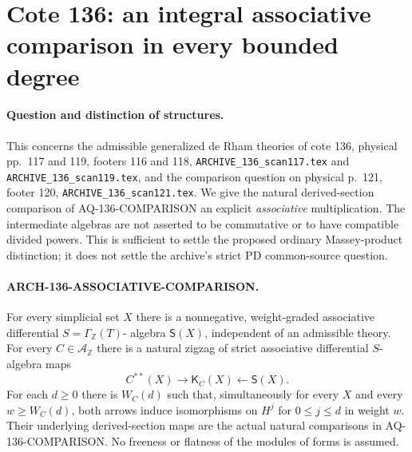 \section{Cote 136: an integral associative comparison in every bounded degree}
\label{sec:136associativecomparison}

\paragraph{Question and distinction of structures.}
This concerns the admissible generalized de Rham theories of
cote 136, physical pp.~117 and 119, footers 116 and 118,
\texttt{ARCHIVE\_136\_scan117.tex} and
\texttt{ARCHIVE\_136\_scan119.tex}, and the comparison question
on physical p.~121, footer 120, \texttt{ARCHIVE\_136\_scan121.tex}.
We give the natural derived-section comparison of
AQ-136-COMPARISON an explicit \emph{associative} multiplication.
The intermediate algebras are not asserted to be commutative
or to have compatible divided powers. This is sufficient to
settle the proposed ordinary Massey-product distinction; it
does not settle the archive's strict PD common-source question.

\paragraph{ARCH-136-ASSOCIATIVE-COMPARISON.}
For every simplicial set $X$ there is a nonnegative,
weight-graded associative differential $S=\Gamma_{\mathbb Z}(T)$-
algebra $\mathsf S(X)$, independent of an admissible theory.
For every $C\in\mathcal A_{\mathbb Z}$ there is a natural
zigzag of strict associative differential $S$-algebra maps
\[
 C^{**}(X)\longrightarrow\mathsf K_C(X)
                           \longleftarrow\mathsf S(X).   \tag{136.AC1}
\]
For each $d\geq0$ there is $W_C(d)$ such that, simultaneously
for every $X$ and every $w\geq W_C(d)$, both arrows induce
isomorphisms on $H^j$ for $0\leq j\leq d$ in weight $w$.
Their underlying derived-section maps are the actual natural
comparisons in AQ-136-COMPARISON. No freeness or flatness
of the modules of forms is assumed.

